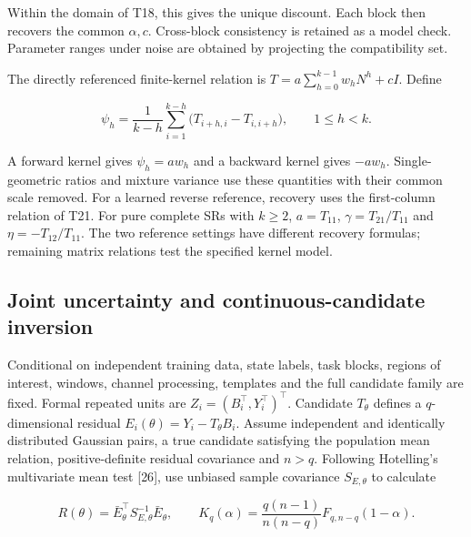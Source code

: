 \documentclass[11pt,a4paper]{article}
\begin{document}
Within the domain of T18, this gives the unique discount. Each block
then recovers the common \(\alpha,c\). Cross-block consistency is
retained as a model check. Parameter ranges under noise are obtained by
projecting the compatibility set.

\par
\noindent\begin{minipage}{\linewidth}

The directly referenced finite-kernel relation is
\(T=a\sum_{h=0}^{k-1}w_hN^h+cI\). Define

\[
\psi_h=\frac{1}{k-h}\sum_{i=1}^{k-h}
\bigl(T_{i+h,i}-T_{i,i+h}\bigr),\qquad 1\leq h<k.
\]

\end{minipage}\par

A forward kernel gives \(\psi_h=aw_h\) and a backward kernel gives
\(-aw_h\). Single-geometric ratios and mixture variance use these
quantities with their common scale removed. For a learned reverse
reference, recovery uses the first-column relation of T21. For pure
complete SRs with \(k\geq2\), \(a=T_{11}\), \(\gamma=T_{21}/T_{11}\) and
\(\eta=-T_{12}/T_{11}\). The two reference settings have different
recovery formulas; remaining matrix relations test the specified kernel
model.

\subsection{Joint uncertainty and continuous-candidate
inversion}\label{joint-uncertainty-and-continuous-candidate-inversion}

\par
\noindent\begin{minipage}{\linewidth}

Conditional on independent training data, state labels, task blocks,
regions of interest, windows, channel processing, templates and the full
candidate family are fixed. Formal repeated units are
\(Z_i=(B_i^\top,Y_i^\top)^\top\). Candidate \(T_\theta\) defines a
\(q\)-dimensional residual \(E_i(\theta)=Y_i-T_\theta B_i\). Assume
independent and identically distributed Gaussian pairs, a true candidate
satisfying the population mean relation, positive-definite residual
covariance and \(n>q\). Following Hotelling's multivariate mean test
{[}26{]}, use unbiased sample covariance \(S_{E,\theta}\) to calculate

\[
R(\theta)=\bar E_\theta^\top S_{E,\theta}^{-1}\bar E_\theta,
\qquad
K_q(\alpha)=\frac{q(n-1)}{n(n-q)}F_{q,n-q}(1-\alpha).
\]

\end{minipage}\par
\end{document}
